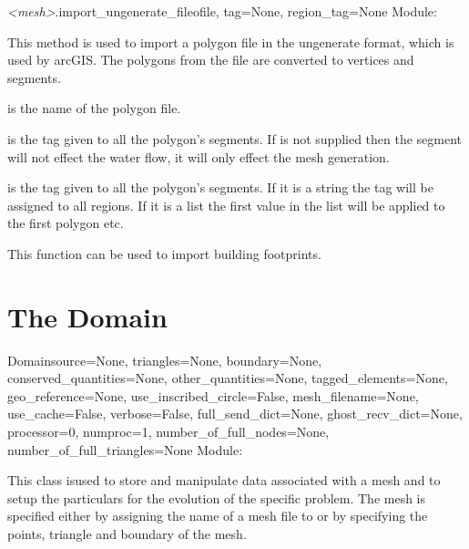 \documentclass{manual}
\begin{document}
\begin{methoddesc}{\emph{<mesh>}.import_ungenerate_file}{ofile,
                                                         tag=None,
                                                         region_tag=None}
Module: 

This method is used to import a polygon file in the ungenerate format,
which is used by arcGIS. The polygons from the file are converted to
vertices and segments.

 is the name of the polygon file.

 is the tag given to all the polygon's segments.
If  is not supplied then the segment will not effect the water
flow, it will only effect the mesh generation.

 is the tag given to all the polygon's segments.  If
it is a string the tag will be assigned to all regions.  If it
is a list the first value in the list will be applied to the first
polygon etc.

This function can be used to import building footprints.
\end{methoddesc}


\chapter{The Domain}
\label{sec:initialising the domain}

\begin{classdesc}{Domain}{source=None,
                          triangles=None,
                          boundary=None,
                          conserved_quantities=None,
                          other_quantities=None,
                          tagged_elements=None,
                          geo_reference=None,
                          use_inscribed_circle=False,
                          mesh_filename=None,
                          use_cache=False,
                          verbose=False,
                          full_send_dict=None,
                          ghost_recv_dict=None,
                          processor=0,
                          numproc=1,
                          number_of_full_nodes=None,
                          number_of_full_triangles=None}
Module: 

This class isused to
store and manipulate data associated with a mesh and to setup the particulars for 
the evolution of the specific problem. The mesh is
specified either by assigning the name of a mesh file to
 or by specifying the points, triangle and boundary of the
mesh.
\end{classdesc}
\end{document}
